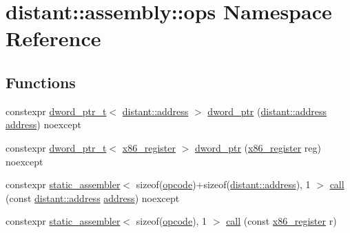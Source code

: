 \hypertarget{namespacedistant_1_1assembly_1_1ops}{}\section{distant\+:\+:assembly\+:\+:ops Namespace Reference}
\label{namespacedistant_1_1assembly_1_1ops}
\subsection*{Functions}
\begin{DoxyCompactItemize}
\item 
constexpr \mbox{\hyperlink{structdistant_1_1assembly_1_1dword__ptr__t}{dword\+\_\+ptr\+\_\+t}}$<$ \mbox{\hyperlink{namespacedistant_a9d7aa6e07cb2f50321e29c209f9a7886}{distant\+::address}} $>$ \mbox{\hyperlink{namespacedistant_1_1assembly_1_1ops_a7da3edc9fb30aef020088257e153a8ac}{dword\+\_\+ptr}} (\mbox{\hyperlink{namespacedistant_a9d7aa6e07cb2f50321e29c209f9a7886}{distant\+::address}} \mbox{\hyperlink{namespacedistant_a9d7aa6e07cb2f50321e29c209f9a7886}{address}}) noexcept
\item 
constexpr \mbox{\hyperlink{structdistant_1_1assembly_1_1dword__ptr__t}{dword\+\_\+ptr\+\_\+t}}$<$ \mbox{\hyperlink{namespacedistant_1_1assembly_a873d3faa0111fc5605de36beaaaafb3e}{x86\+\_\+register}} $>$ \mbox{\hyperlink{namespacedistant_1_1assembly_1_1ops_a0ddaf5bfcaf30283e0a30381824ab998}{dword\+\_\+ptr}} (\mbox{\hyperlink{namespacedistant_1_1assembly_a873d3faa0111fc5605de36beaaaafb3e}{x86\+\_\+register}} reg) noexcept
\item 
constexpr \mbox{\hyperlink{classdistant_1_1assembly_1_1static__assembler}{static\+\_\+assembler}}$<$ sizeof(\mbox{\hyperlink{namespacedistant_1_1assembly_a64d7b047d9e3df1ac04919f7c4f8f6fa}{opcode}})+sizeof(\mbox{\hyperlink{namespacedistant_a9d7aa6e07cb2f50321e29c209f9a7886}{distant\+::address}}), 1 $>$ \mbox{\hyperlink{namespacedistant_1_1assembly_1_1ops_ac78a868958995be12d1ecf14b88d288d}{call}} (const \mbox{\hyperlink{namespacedistant_a9d7aa6e07cb2f50321e29c209f9a7886}{distant\+::address}} \mbox{\hyperlink{namespacedistant_a9d7aa6e07cb2f50321e29c209f9a7886}{address}}) noexcept
\item 
constexpr \mbox{\hyperlink{classdistant_1_1assembly_1_1static__assembler}{static\+\_\+assembler}}$<$ sizeof(\mbox{\hyperlink{namespacedistant_1_1assembly_a64d7b047d9e3df1ac04919f7c4f8f6fa}{opcode}}), 1 $>$ \mbox{\hyperlink{namespacedistant_1_1assembly_1_1ops_aec6718183f68739e47dcfb73bae8c46b}{call}} (const \mbox{\hyperlink{namespacedistant_1_1assembly_a873d3faa0111fc5605de36beaaaafb3e}{x86\+\_\+register}} r)

\end{DoxyCompactItemize}
